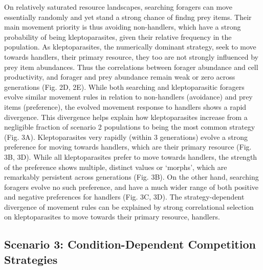 \documentclass[11pt]{article}
\begin{document}
On relatively saturated resource landscapes, searching foragers can move essentially randomly and yet stand a strong chance of findng prey items.
Their main movement priority is thus avoiding non-handlers, which have a strong probability of being kleptoparasites, given their relative frequency in the population.
As kleptoparasites, the numerically dominant strategy, seek to move towards handlers, their primary resource, they too are not strongly influenced by prey item abundances.
Thus the correlations between forager abundance and cell productivity, and forager and prey abundance remain weak or zero across generations (Fig. 2D, 2E).
While both searching and kleptoparasitic foragers evolve similar movement rules in relation to non-handlers (avoidance) and prey items (preference), the evolved movement response to handlers shows a rapid divergence.
This divergence helps explain how kleptoparasites increase from a negligible fraction of scenario 2 populations to being the most common strategy (Fig. 3A).
Kleptoparasites very rapidly (within 3 generations) evolve a strong preference for moving towards handlers, which are their primary resource (Fig. 3B, 3D).
While all kleptoparasites prefer to move towards handlers, the strength of the preference shows multiple, distinct values or `morphs', which are remarkably persistent across generations (Fig. 3B).
On the other hand, searching foragers evolve no such preference, and have a much wider range of both positive and negative preferences for handlers (Fig. 3C, 3D).
The strategy-dependent divergence of movement rules can be explained by strong correlational selection on kleptoparasites to move towards their primary resource, handlers.

\subsection{Scenario 3: Condition-Dependent Competition Strategies}
\end{document}
